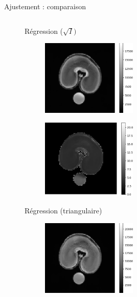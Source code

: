 \documentclass[10pt]{beamer}
\begin{document}
\begin{frame}{Ajustement : comparaison}
\begin{columns}
    \begin{column}[c]{0.8\textwidth}
      \begin{figure}[ht]
    \begin{flushleft}
      Régression ($\sqrt{I})$
      \vspace{-0.1cm}
    \end{flushleft}
    \begin{subfigure}[t]{0.5\textwidth}
      \centering
      \includegraphics[width=0.5\textwidth]{fig/linear_regression_old}
    \end{subfigure}%
    \begin{subfigure}[t]{0.5\textwidth}
      \centering
      \includegraphics[width=0.5\textwidth]{fig/linear_regression_old_t2}
    \end{subfigure}%
    \begin{flushleft}
      Régression (triangulaire)
      \vspace{-0.25cm}
    \end{flushleft}
    \begin{subfigure}[t]{0.5\textwidth}
      \centering
      \includegraphics[width=0.5\textwidth]{fig/linear_regression_new}

\end{subfigure}
\end{figure}
\end{column}
\end{columns}
\end{frame}
\end{document}

